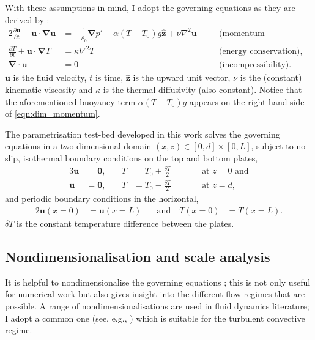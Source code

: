 \documentclass[titlepage]{article}
\numberwithin{equation}{section}
\newcommand{\pdiff}[2]{\frac{\partial #1}{\partial #2}}
\renewcommand\vec{\bm}
\newcommand{\uvec}[1]{\vec{\hat{#1}}}
\newcommand{\grad}{\vec{\nabla}}
\begin{document}
With these assumptions in mind, I adopt the governing equations as they
are derived by \textcite{chandrasekhar1961}:
\begin{alignat}{2}
    \label{eqn:dim_momentum}
    \pdiff{\vec{u}}{t} + \vec{u} \cdot \grad \vec{u}
        &= -\frac{1}{\rho_0} \grad p' + \alpha (T - T_0) g \uvec{z}
        + \nu \nabla^2 \vec{u}
    &\quad& \text{(momentum conservation),} \\
    \label{eqn:dim_energy}
    \pdiff{T}{t} + \vec{u} \cdot \grad T
        &= \kappa \nabla^2 T
    && \text{(energy conservation), and} \\
    \label{eqn:dim_incompressible}
    \grad \cdot \vec{u} &= 0
    && \text{(incompressibility).}
\end{alignat}
$\vec{u}$ is the fluid velocity, $t$ is time, $\uvec{z}$ is the upward
unit vector, $\nu$ is the (constant) kinematic viscosity and $\kappa$ is
the thermal diffusivity (also constant). Notice that the aforementioned
buoyancy term $\alpha (T - T_0) g$ appears on the right-hand side of
\cref{eqn:dim_momentum}.

The parametrisation test-bed developed in this work solves the governing
equations in a two-dimensional domain $(x,z) \in [0, d] \times [0, L]$, subject
to no-slip, isothermal boundary conditions on the top and bottom plates,
\begin{alignat}{3}
    \label{eqn:dim_bc_bot}
    \vec{u} &= \vec{0}, &\quad T &= T_0 + \frac{\delta T}{2}
    &\qquad& \text{at } z = 0 \text{ and} \\
    \label{eqn:dim_bc_top}
    \vec{u} &= \vec{0}, &\quad T &= T_0 - \frac{\delta T}{2}
    &\qquad& \text{at } z = d,
\end{alignat}
and periodic boundary conditions in the horizontal,
\begin{alignat}{2}
    \label{eqn:dim_bc_sides}
    \vec{u}(x=0) &= \vec{u}(x=L) &\quad \text{and} \quad T(x=0) &= T(x=L).
\end{alignat}
$\delta T$ is the constant temperature difference between the plates.

\subsection{Nondimensionalisation and scale analysis}
It is helpful to nondimensionalise the governing equations
; this is not only useful
for numerical work but also gives insight into the different flow
regimes that are possible. A range of nondimensionalisations are used in
fluid dynamics literature; I adopt a common one (see, e.g.,
\textcite{grotzbach1983,ouertatani2008,stevens2010}) which is suitable
for the turbulent convective regime.
\end{document}
